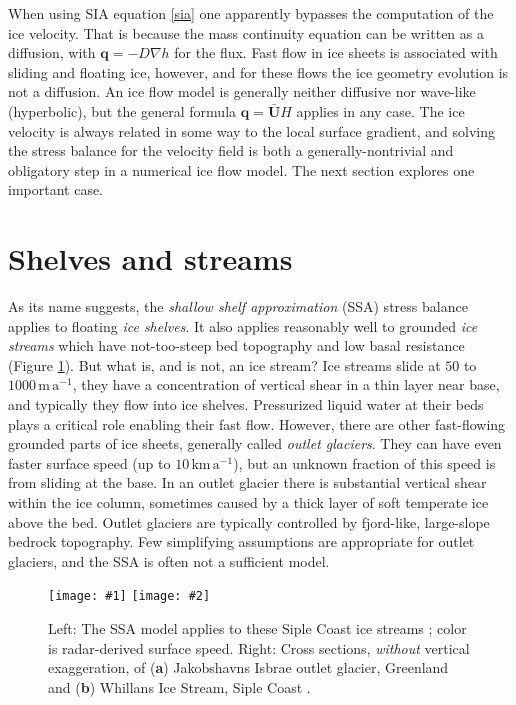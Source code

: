 \documentclass[letterpaper,final,12pt,reqno]{amsart}
\newcommand{\bq}{\mathbf{q}}
\newcommand{\bU}{\mathbf{U}}
\newcommand{\twofigsizes}[5]{
\begin{figure}[ht]
\centering
\texttt{[image: \#1]} \quad
\texttt{[image: \#2]}
\caption{#3}
\label{fig:#1}
\end{figure}}
\begin{document}
When using SIA equation \eqref{sia} one apparently bypasses the computation of the ice velocity.  That is because the mass continuity equation can be written as a diffusion, with $\bq=-D\nabla h$ for the flux.  Fast flow in ice sheets is associated with sliding and floating ice, however, and for these flows the ice geometry evolution is not a diffusion.  An ice flow model is generally neither diffusive nor wave-like (hyperbolic), but the general formula $\bq = \bar{\bU} H$ applies in any case.  The ice velocity is always related in some way to the local surface gradient, and solving the stress balance for the velocity field is both a generally-nontrivial and obligatory step in a numerical ice flow model.  The next section explores one important case.


\section{Shelves and streams}  \label{sec:shelvesandstreams}

As its name suggests, the \emph{shallow shelf approximation} (SSA) stress balance applies to floating \emph{ice shelves}.  It also applies reasonably well to grounded \emph{ice streams} which have not-too-steep bed topography and low basal resistance (Figure \ref{fig:siple}).  But what is, and is not, an ice stream?  Ice streams slide at $50$ to $1000 \,\text{m}\,\text{a}^{-1}$, they have a concentration of vertical shear in a thin layer near base, and typically they flow into ice shelves.  Pressurized liquid water at their beds plays a critical role enabling their fast flow.  However, there are other fast-flowing grounded parts of ice sheets,  generally called \emph{outlet glaciers}.  They can have even faster surface speed (up to $10 \,\text{km}\,\text{a}^{-1}$), but an unknown fraction of this speed is from sliding at the base.  In an outlet glacier there is substantial vertical shear within the ice column, sometimes caused by a thick layer of soft temperate ice above the bed.  Outlet glaciers are typically controlled by fjord-like, large-slope bedrock topography.  Few simplifying assumptions are appropriate for outlet glaciers, and the SSA is often not a sufficient model.

\twofigsizes{siple}{streamisbrae}{Left:  The SSA model applies to these Siple Coast ice streams \cite{Joughinetal2002}; color is radar-derived surface speed.  Right: Cross sections, \emph{without} vertical exaggeration, of (\textbf{a}) Jakobshavns Isbrae outlet glacier, Greenland and (\textbf{b}) Whillans Ice Stream, Siple Coast \cite{TrufferEchelmeyer}.}{2.8in}{2.9in}
\end{document}
